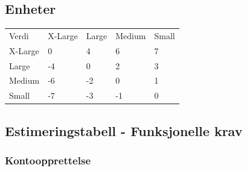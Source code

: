 \documentclass[12pt]{article}
\newcommand{\invis}{\phantom{a}}
\newcommand{\cellr}{\cellcolor{red!25}}
\newcommand{\cello}{\cellcolor{orange!25}}
\newcommand{\celly}{\cellcolor{yellow!25}}
\newcommand{\celll}{\cellcolor{lime!25}}
\newcommand{\cellg}{\cellcolor{green!25}}
\begin{document}
    \subsection{Enheter}

    \begin{tabular}{|p{2cm}|
        >{\centering\arraybackslash}p{3cm}|
        >{\centering\arraybackslash}p{3cm}|
        >{\centering\arraybackslash}p{3cm}|
        >{\centering\arraybackslash}p{3cm}|}     
        \hline 
        \invis & \multicolumn{4}{|c|}{Utviklingsstørrelse}\\
        \hline
        Verdi & X-Large & Large & Medium & Small\\
        \hline
        X-Large &   \celly0 &
                    \cellg4 &
                    \cellg6 &
                    \cellg7 \\
        \hline
        Large &     \cellr-4 &
                    \celly0 &
                    \celll2 &
                    \cellg3 \\
        \hline
        Medium &    \cellr-6 &
                    \cello-2 &
                    \celly0 &
                    \celll1 \\
        \hline
        Small &     \cellr-7 &
                    \cellr-3 &
                    \cello-1 &
                    \celly0 \\
        \hline 
    \end{tabular}

    \subsection{Estimeringstabell - Funksjonelle krav}

        \subsubsection{Kontoopprettelse}
        
\end{document}
